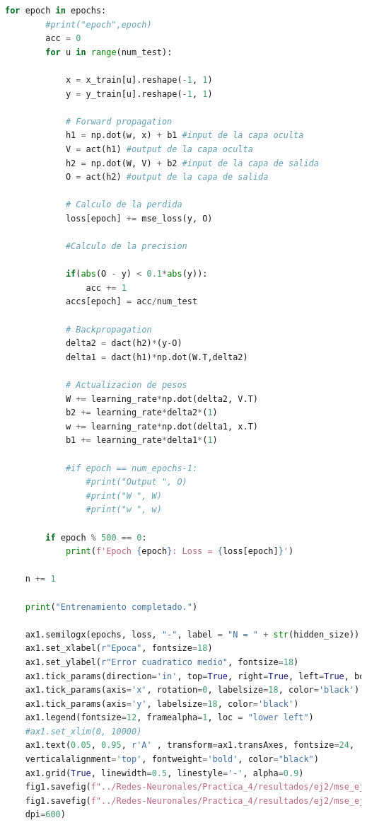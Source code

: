 \documentclass[11pt,twocolumn,twoside]{opticajnl}
\begin{document}
\begin{onecolumn}
\begin{lstlisting}[language=Python, caption={Ejercicio 2}, label=ej2]
    for epoch in epochs:
        #print("epoch",epoch)
        acc = 0  
        for u in range(num_test):

            x = x_train[u].reshape(-1, 1)
            y = y_train[u].reshape(-1, 1)

            # Forward propagation
            h1 = np.dot(w, x) + b1 #input de la capa oculta
            V = act(h1) #output de la capa oculta
            h2 = np.dot(W, V) + b2 #input de la capa de salida
            O = act(h2) #output de la capa de salida

            # Calculo de la perdida
            loss[epoch] += mse_loss(y, O)
        
            #Calculo de la precision 
    
            if(abs(O - y) < 0.1*abs(y)):
                acc += 1
            accs[epoch] = acc/num_test
                
            # Backpropagation
            delta2 = dact(h2)*(y-O)
            delta1 = dact(h1)*np.dot(W.T,delta2)

            # Actualizacion de pesos
            W += learning_rate*np.dot(delta2, V.T) 
            b2 += learning_rate*delta2*(1) 
            w += learning_rate*np.dot(delta1, x.T) 
            b1 += learning_rate*delta1*(1) 

            #if epoch == num_epochs-1:
                #print("Output ", O)
                #print("W ", W)
                #print("w ", w)

        if epoch % 500 == 0:
            print(f'Epoch {epoch}: Loss = {loss[epoch]}')

    n += 1

    print("Entrenamiento completado.")

    ax1.semilogx(epochs, loss, "-", label = "N = " + str(hidden_size))
    ax1.set_xlabel(r"Epoca", fontsize=18)
    ax1.set_ylabel(r"Error cuadratico medio", fontsize=18)
    ax1.tick_params(direction='in', top=True, right=True, left=True, bottom=True)
    ax1.tick_params(axis='x', rotation=0, labelsize=18, color='black')
    ax1.tick_params(axis='y', labelsize=18, color='black')
    ax1.legend(fontsize=12, framealpha=1, loc = "lower left")
    #ax1.set_xlim(0, 10000)
    ax1.text(0.05, 0.95, r'A' , transform=ax1.transAxes, fontsize=24, 
    verticalalignment='top', fontweight='bold', color="black")
    ax1.grid(True, linewidth=0.5, linestyle='-', alpha=0.9)
    fig1.savefig(f"../Redes-Neuronales/Practica_4/resultados/ej2/mse_ej2.pdf")
    fig1.savefig(f"../Redes-Neuronales/Practica_4/resultados/ej2/mse_ej2.png", 
    dpi=600)


\end{lstlisting}
\end{onecolumn}
\end{document}
